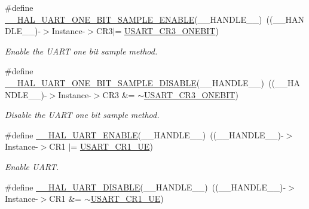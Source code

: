 \begin{DoxyCompactItemize}
\#define \mbox{\hyperlink{group___u_a_r_t___exported___macros_ga3524747e5896296ab066d786431503ce}{\+\_\+\+\_\+\+H\+A\+L\+\_\+\+U\+A\+R\+T\+\_\+\+O\+N\+E\+\_\+\+B\+I\+T\+\_\+\+S\+A\+M\+P\+L\+E\+\_\+\+E\+N\+A\+B\+LE}}(\+\_\+\+\_\+\+H\+A\+N\+D\+L\+E\+\_\+\+\_\+)~((\+\_\+\+\_\+\+H\+A\+N\+D\+L\+E\+\_\+\+\_\+)-\/$>$Instance-\/$>$C\+R3$\vert$= \mbox{\hyperlink{group___peripheral___registers___bits___definition_ga9a96fb1a7beab602cbc8cb0393593826}{U\+S\+A\+R\+T\+\_\+\+C\+R3\+\_\+\+O\+N\+E\+B\+IT}})
\begin{DoxyCompactList}\small\item\em Enable the U\+A\+RT one bit sample method. \end{DoxyCompactList}\item 
\#define \mbox{\hyperlink{group___u_a_r_t___exported___macros_ga2dbd7e6592e8c5999f817b69f0fd24bb}{\+\_\+\+\_\+\+H\+A\+L\+\_\+\+U\+A\+R\+T\+\_\+\+O\+N\+E\+\_\+\+B\+I\+T\+\_\+\+S\+A\+M\+P\+L\+E\+\_\+\+D\+I\+S\+A\+B\+LE}}(\+\_\+\+\_\+\+H\+A\+N\+D\+L\+E\+\_\+\+\_\+)~((\+\_\+\+\_\+\+H\+A\+N\+D\+L\+E\+\_\+\+\_\+)-\/$>$Instance-\/$>$C\+R3 \&= $\sim$\mbox{\hyperlink{group___peripheral___registers___bits___definition_ga9a96fb1a7beab602cbc8cb0393593826}{U\+S\+A\+R\+T\+\_\+\+C\+R3\+\_\+\+O\+N\+E\+B\+IT}})
\begin{DoxyCompactList}\small\item\em Disable the U\+A\+RT one bit sample method. \end{DoxyCompactList}\item 
\#define \mbox{\hyperlink{group___u_a_r_t___exported___macros_ga49eb5ea4996a957afeb8be2793ba3fe9}{\+\_\+\+\_\+\+H\+A\+L\+\_\+\+U\+A\+R\+T\+\_\+\+E\+N\+A\+B\+LE}}(\+\_\+\+\_\+\+H\+A\+N\+D\+L\+E\+\_\+\+\_\+)~((\+\_\+\+\_\+\+H\+A\+N\+D\+L\+E\+\_\+\+\_\+)-\/$>$Instance-\/$>$C\+R1 $\vert$= \mbox{\hyperlink{group___peripheral___registers___bits___definition_ga2bb650676aaae4a5203f372d497d5947}{U\+S\+A\+R\+T\+\_\+\+C\+R1\+\_\+\+UE}})
\begin{DoxyCompactList}\small\item\em Enable U\+A\+RT. \end{DoxyCompactList}\item 
\#define \mbox{\hyperlink{group___u_a_r_t___exported___macros_gad2f9fbdb4adf3a09939e201eaeea072f}{\+\_\+\+\_\+\+H\+A\+L\+\_\+\+U\+A\+R\+T\+\_\+\+D\+I\+S\+A\+B\+LE}}(\+\_\+\+\_\+\+H\+A\+N\+D\+L\+E\+\_\+\+\_\+)~((\+\_\+\+\_\+\+H\+A\+N\+D\+L\+E\+\_\+\+\_\+)-\/$>$Instance-\/$>$C\+R1 \&= $\sim$\mbox{\hyperlink{group___peripheral___registers___bits___definition_ga2bb650676aaae4a5203f372d497d5947}{U\+S\+A\+R\+T\+\_\+\+C\+R1\+\_\+\+UE}})

\end{DoxyCompactItemize}
